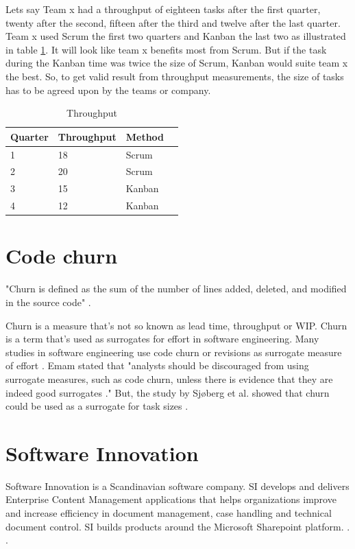 \documentclass[UKenglish]{ifimaster}  %
\begin{document}
Lets say Team x had a throughput of eighteen tasks after the first quarter, twenty after the second, fifteen after the third and twelve after the last quarter. Team x used Scrum the first two quarters and Kanban the last two as illustrated in table \ref{tt}. It will look like team x benefits most from Scrum. But if the task during the Kanban time was twice the size of Scrum, Kanban would suite team x the best. So, to get valid result from throughput measurements, the size of tasks has to be agreed upon by the teams or company.
\begin{table}[ht]
\begin{center}
    \begin{tabular}{| l | l | l | l |}
    \hline
    Quarter & Throughput & Method\\ \hline
    1 & 18 & Scrum\\ \hline
    2 & 20 & Scrum \\ \hline
    3 & 15 & Kanban\\ \hline
    4 & 12 & Kanban\\ \hline
    \end{tabular}
\caption{Throughput}
\label{tt} %
\end{center}
\end{table}

\section{Code churn}
\label{sec:Churn}
"Churn is defined as the sum of the number of lines added, deleted, and modified in the source code" \parencite{Dag}.

Churn is a measure that's not so known as lead time, throughput or WIP. Churn is a term that's used as surrogates for effort in software engineering. Many studies in software engineering use code churn or revisions as surrogate measure of effort \parencite{yamashita2012quantifying}. Emam stated that "analysts should be discouraged from using surrogate measures, such as code churn, unless there is evidence that they are indeed good surrogates \parencite{el2000methodology}."  But, the study by Sjøberg et al. showed that churn could be used as a surrogate for task sizes \parencite{yamashita2012quantifying}. 


\section{Software Innovation}
\label{sec:SI}
Software Innovation is a Scandinavian software company. SI develops and delivers Enterprise Content Management applications that helps organizations improve and increase efficiency in document management, case handling and technical document control. SI builds products around the Microsoft Sharepoint platform. \parencite{Dag}. \parencite{SI}.
\end{document}
